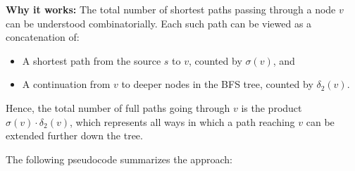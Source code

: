 \documentclass[12pt]{article}
\begin{document}
\begin{itemize}
	      \textbf{Why it works:} The total number of shortest paths passing through a node \( v \)
	      can be understood combinatorially. Each such path can be viewed as a concatenation of:
	      \begin{itemize}
		      \item A shortest path from the source \( s \) to \( v \), counted by \( \sigma(v) \), and
		      \item A continuation from \( v \) to deeper nodes in the BFS tree, counted by \( \delta_2(v) \).
	      \end{itemize}
	      Hence, the total number of full paths going through \( v \) is the product \( \sigma(v) \cdot \delta_2(v) \),
	      which represents all ways in which a path reaching \( v \) can be extended further down the tree.
\end{itemize}

The following pseudocode summarizes the approach:
\end{document}
